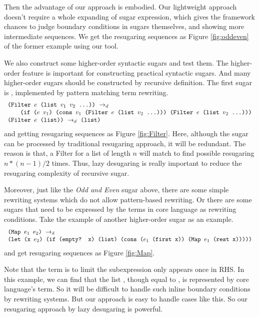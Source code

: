 Then the advantage of our approach is embodied. Our lightweight approach doesn't require a whole expanding of sugar expression, which gives the framework chances to judge boundary conditions in sugars themselves, and showing more intermediate sequences. We get the resugaring sequences as Figure \ref{fig:oddeven} of the former example using our tool.



We also construct some higher-order syntactic sugars and test them. The higher-order feature is important for constructing practical syntactic sugars. And many higher-order sugars should be constructed by recursive definition. The first sugar is , implemented by pattern matching term rewriting.
\[\begin{array}{l}
\drule{\Code{(Filter $e$ (list $v_1$ $v_2$ ...))}}{}\\
\qquad\Code{(if ($e$ $v_1$) (cons $v_1$ (Filter $e$ (list $v_2$ ...)))\ (Filter $e$ (list $v_2$ ...)))}\\
\drule{\Code{(Filter $e$ (list))}}{\Code{(list)}}
\end{array}\]
and getting resugaring sequences as Figure \ref{fig:Filter}.
Here, although the sugar can be processed by traditional resugaring approach, it will be redundant. The reason is that, a Filter for a list of length $n$ will match to find possible resugaring $n*(n-1)/2$ times. Thus, lazy desugaring is really important to reduce the resugaring complexity of recursive sugar.

Moreover, just like the \emph{Odd and Even} sugar above, there are some simple rewriting systems which do not allow pattern-based rewriting. Or there are some sugars that need to be expressed by the terms in core language as rewriting conditions. Take the example of another higher-order sugar  as an example.
\[
\begin{array}{l}
\texttt{(Map $e_1$ $e_2$)} ~\rightarrow_d~\\
\texttt{(let (x $e_2$) (if (empty? x) (list) (cons ($e_1$ (first x)) (Map $e_1$ (rest x)))))}
\end{array}
\]
and get resugaring sequences as Figure \ref{fig:Map}.


Note that the  term is to limit the subexpression only appears once in RHS. In this example, we can find that the list , though equal to , is represented by core language's term. So it will be difficult to handle such inline boundary conditions by rewriting systems. But our approach is easy to handle cases like this. So our resugaring approach by lazy desugaring is powerful.
